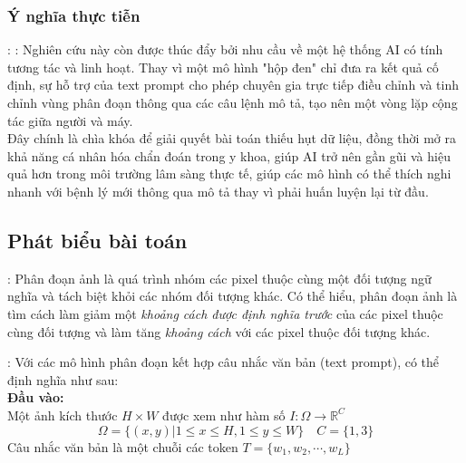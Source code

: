 \subsubsection{Ý nghĩa thực tiễn}
\begin{frame}{\secname: \subsecname: \subsubsecname}
    Nghiên cứu này còn được thúc đẩy bởi nhu cầu về một hệ thống AI có tính tương tác và linh hoạt. Thay vì một mô hình "hộp đen" chỉ đưa ra kết quả cố định, sự hỗ trợ của text prompt cho phép chuyên gia trực tiếp điều chỉnh và tinh chỉnh vùng phân đoạn thông qua các câu lệnh mô tả, tạo nên một vòng lặp cộng tác giữa người và máy. \\
    Đây chính là chìa khóa để giải quyết bài toán thiếu hụt dữ liệu, đồng thời mở ra khả năng cá nhân hóa chẩn đoán trong y khoa, giúp AI trở nên gần gũi và hiệu quả hơn trong môi trường lâm sàng thực tế, giúp các mô hình có thể thích nghi nhanh với bệnh lý mới thông qua mô tả thay vì phải huấn luyện lại từ đầu.
\end{frame}

\subsection{Phát biểu bài toán}
\begin{frame}{\secname: \subsecname}
    Phân đoạn ảnh là quá trình nhóm các pixel thuộc cùng một đối tượng ngữ nghĩa và tách biệt khỏi các nhóm đối tượng khác. Có thể hiểu, phân đoạn ảnh là tìm cách làm giảm một \textit{khoảng cách được định nghĩa trước} của các pixel thuộc cùng đối tượng và làm tăng \textit{khoảng cách} với các pixel thuộc đối tượng khác.
\end{frame}

\begin{frame}{\secname: \subsecname}
    Với các mô hình phân đoạn kết hợp câu nhắc văn bản (text prompt), có thể định nghĩa như sau: \\

    \textbf{Đầu vào:} \\
    Một ảnh kích thước $H \times W$ được xem như hàm số $I: \Omega \rightarrow \mathbb{R}^C$ \\
    $$ \Omega = \{(x, y) | 1 \le x \le H, 1 \le y \le W\} \quad C=\{1, 3\}$$
    Câu nhắc văn bản là một chuỗi các token $T=\{w_1, w_2, \cdots, w_L\}$
\end{frame}

